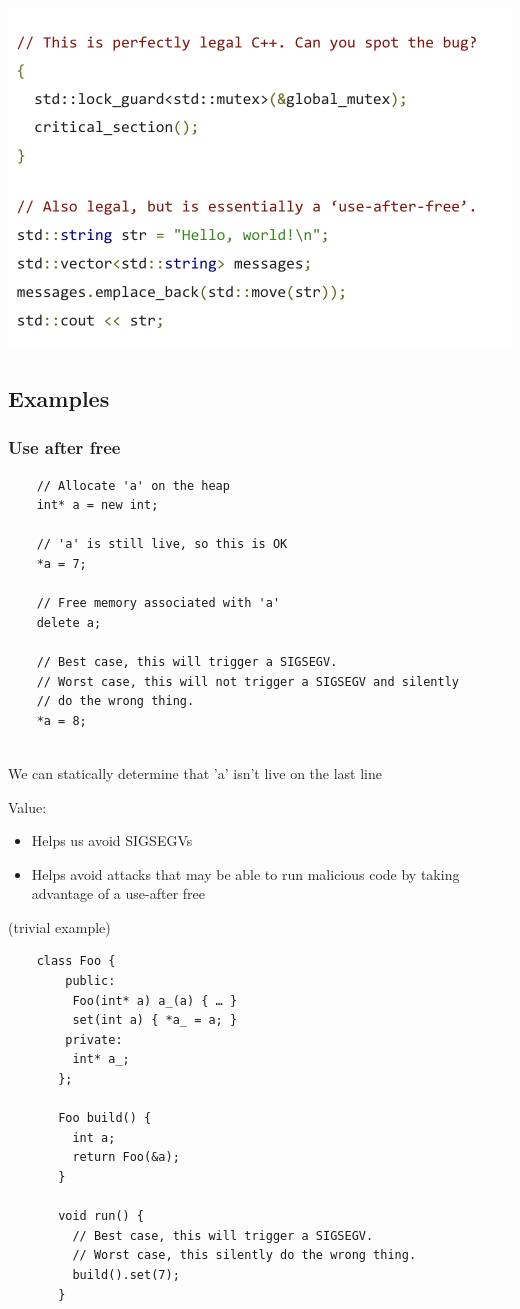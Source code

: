 \documentclass{article}
\begin{document}
\begin{center}
    \includegraphics*[width=0.7\linewidth]{linter.png}
\end{center}

\subsection{Examples}

\subsubsection{Use after free}

\begin{verbatim}
    // Allocate 'a' on the heap
    int* a = new int;
    
    // 'a' is still live, so this is OK
    *a = 7;
    
    // Free memory associated with 'a'
    delete a;
    
    // Best case, this will trigger a SIGSEGV.
    // Worst case, this will not trigger a SIGSEGV and silently
    // do the wrong thing.
    *a = 8;
    
\end{verbatim}

We can statically determine that 'a' isn't live on the last line

Value:
\begin{itemize}
    \item Helps us avoid SIGSEGVs
    \item Helps avoid attacks that may be able to run malicious code by taking advantage of a use-after free 
\end{itemize}

(trivial example)

\hrulefill

\begin{verbatim}
    class Foo {
        public:
         Foo(int* a) a_(a) { … }
         set(int a) { *a_ = a; }
        private:
         int* a_;
       };
       
       Foo build() {
         int a;
         return Foo(&a);
       }
       
       void run() {
         // Best case, this will trigger a SIGSEGV.
         // Worst case, this silently do the wrong thing.
         build().set(7);
       }
       
\end{verbatim}
\end{document}
